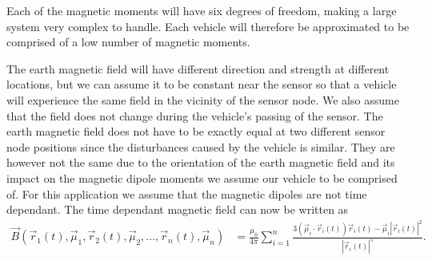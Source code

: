 Each of the magnetic moments will have six degrees of freedom, making a large system very complex to handle. Each vehicle will therefore be approximated to be comprised of a low number of magnetic moments.

The earth magnetic field will have different direction and strength at different locations, but we can assume it to be constant near the sensor so that a vehicle will experience the same field in the vicinity of the sensor node. We also assume that the field does not change during the vehicle's passing of the sensor. The earth magnetic field does not have to be exactly equal at two different sensor node positions since the disturbances caused by the vehicle is similar. They are however not the same due to the orientation of the earth magnetic field and its impact on the magnetic dipole moments we assume our vehicle to be comprised of. For this application we assume that the magnetic dipoles are not time dependant. The time dependant magnetic field can now be written as
\begin{align}
\vec{B}(\vec{r}_1(t),\vec{\mu}_1, \vec{r}_2(t), \vec{\mu}_2,...,\vec{r}_n(t),\vec{\mu}_n) &= \frac{\mu_0}{4\pi} \sum_{i=1}^{n} \frac{3\left(\vec{\mu}_i \cdot \vec{r}_i(t) \right) \vec{r}_i(t) - \vec{\mu}_i\left|\vec{r}_i(t)\right|^2}{\left|\vec{r}_i(t)\right|^5}.
\end{align}

